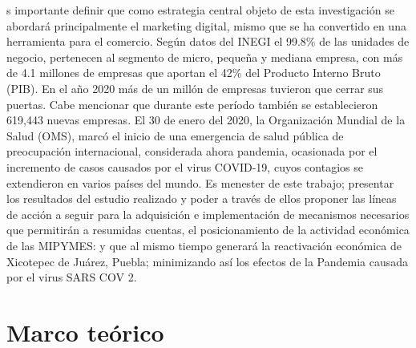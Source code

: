 \documentclass[12pt]{difu100cia} %
\begin{document}
s importante definir que como estrategia central objeto de esta investigación se abordará principalmente el marketing digital, mismo que se ha convertido en una herramienta para el comercio.
Según datos del INEGI el 99.8\% de las unidades de negocio, pertenecen al segmento de micro, pequeña y mediana empresa, con más de 4.1 millones de empresas que aportan el 42\% del Producto Interno Bruto (PIB).
En el año 2020 más de un millón de empresas tuvieron que cerrar sus puertas. Cabe mencionar que durante este período también se establecieron 619,443 nuevas empresas.
El 30 de enero del 2020, la Organización Mundial de la Salud (OMS), marcó el inicio de una emergencia de salud pública de preocupación internacional, considerada ahora pandemia, ocasionada por el incremento de casos causados por el virus COVID-19, cuyos contagios se extendieron en varios países del mundo.
Es menester de este trabajo; presentar los resultados del estudio realizado y poder a través de ellos proponer las líneas de acción a seguir para la adquisición e implementación de mecanismos necesarios que permitirán a resumidas cuentas, el posicionamiento de la actividad económica de las MIPYMES: y que al mismo tiempo generará la reactivación económica de Xicotepec de Juárez, Puebla; minimizando así los efectos de la Pandemia causada por el virus SARS COV 2.



\section{Marco teórico}
\label{Marco teorico}
\end{document}
